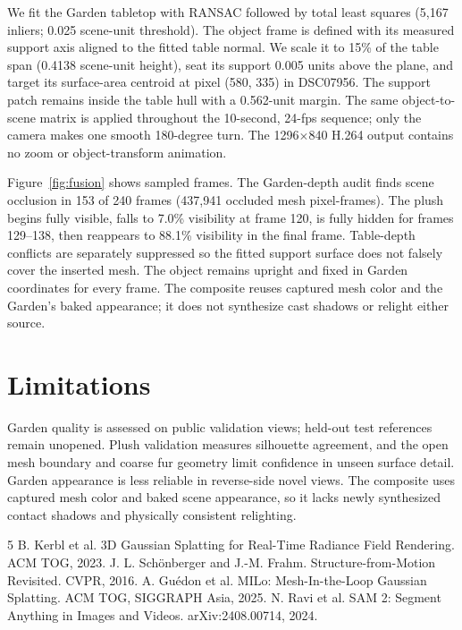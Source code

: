 \documentclass[10pt,twocolumn,letterpaper]{article}
\begin{document}
We fit the Garden tabletop with RANSAC followed by total least squares (5,167 inliers; 0.025 scene-unit threshold). The object frame is defined with its measured support axis aligned to the fitted table normal. We scale it to 15\% of the table span (0.4138 scene-unit height), seat its support 0.005 units above the plane, and target its surface-area centroid at pixel (580, 335) in DSC07956. The support patch remains inside the table hull with a 0.562-unit margin. The same object-to-scene matrix is applied throughout the 10-second, 24-fps sequence; only the camera makes one smooth 180-degree turn. The 1296$\times$840 H.264 output contains no zoom or object-transform animation.

Figure~\ref{fig:fusion} shows sampled frames. The Garden-depth audit finds scene occlusion in 153 of 240 frames (437,941 occluded mesh pixel-frames). The plush begins fully visible, falls to 7.0\% visibility at frame 120, is fully hidden for frames 129--138, then reappears to 88.1\% visibility in the final frame. Table-depth conflicts are separately suppressed so the fitted support surface does not falsely cover the inserted mesh. The object remains upright and fixed in Garden coordinates for every frame. The composite reuses captured mesh color and the Garden's baked appearance; it does not synthesize cast shadows or relight either source.

\section{Limitations}
Garden quality is assessed on public validation views; held-out test references remain unopened. Plush validation measures silhouette agreement, and the open mesh boundary and coarse fur geometry limit confidence in unseen surface detail. Garden appearance is less reliable in reverse-side novel views. The composite uses captured mesh color and baked scene appearance, so it lacks newly synthesized contact shadows and physically consistent relighting.

\begin{thebibliography}{5}\footnotesize
{} B. Kerbl et al. 3D Gaussian Splatting for Real-Time Radiance Field Rendering. ACM TOG, 2023.
 J. L. Sch\"onberger and J.-M. Frahm. Structure-from-Motion Revisited. CVPR, 2016.
 A. Gu\'edon et al. MILo: Mesh-In-the-Loop Gaussian Splatting. ACM TOG, SIGGRAPH Asia, 2025.
 N. Ravi et al. SAM 2: Segment Anything in Images and Videos. arXiv:2408.00714, 2024.
\end{thebibliography}
\end{document}

